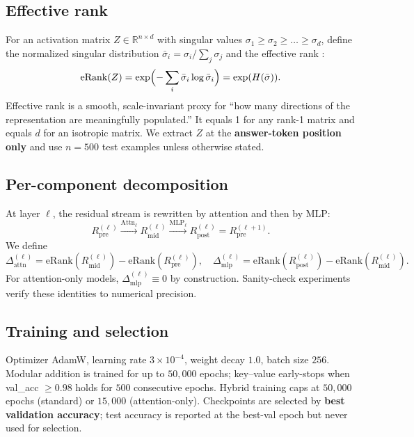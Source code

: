 \documentclass{article}
\begin{document}
\subsection{Effective rank}

For an activation matrix $Z\in\mathbb{R}^{n\times d}$ with singular values $\sigma_1\ge\sigma_2\ge\dots\ge\sigma_d$, define the normalized singular distribution $\bar{\sigma}_i=\sigma_i/\sum_j\sigma_j$ and the effective rank \citep{roy2007effective}:
\begin{equation}
    \mathrm{eRank}(Z) = \exp\Bigl(-\sum_i \bar{\sigma}_i\log\bar{\sigma}_i\Bigr) = \exp(H(\bar{\sigma})).
    \label{eq:erank}
\end{equation}
Effective rank is a smooth, scale-invariant proxy for ``how many directions of the representation are meaningfully populated.'' It equals 1 for any rank-1 matrix and equals $d$ for an isotropic matrix. We extract $Z$ at the \textbf{answer-token position only} and use $n=500$ test examples unless otherwise stated.

\subsection{Per-component decomposition}

At layer $\ell$, the residual stream is rewritten by attention and then by MLP:
\[ R_{\text{pre}}^{(\ell)} \xrightarrow{\text{Attn}_\ell} R_{\text{mid}}^{(\ell)} \xrightarrow{\text{MLP}_\ell} R_{\text{post}}^{(\ell)} = R_{\text{pre}}^{(\ell+1)}. \]
We define
\begin{equation}
    \Delta_{\text{attn}}^{(\ell)} = \mathrm{eRank}(R_{\text{mid}}^{(\ell)}) - \mathrm{eRank}(R_{\text{pre}}^{(\ell)}), \quad
    \Delta_{\text{mlp}}^{(\ell)} = \mathrm{eRank}(R_{\text{post}}^{(\ell)}) - \mathrm{eRank}(R_{\text{mid}}^{(\ell)}).
    \label{eq:deltas}
\end{equation}
For attention-only models, $\Delta_{\text{mlp}}^{(\ell)}\equiv 0$ by construction. Sanity-check experiments verify these identities to numerical precision.

\subsection{Training and selection}

Optimizer AdamW, learning rate $3\times 10^{-4}$, weight decay $1.0$, batch size $256$. Modular addition is trained for up to $50{,}000$ epochs; key--value early-stops when val\_acc $\ge 0.98$ holds for $500$ consecutive epochs. Hybrid training caps at $50{,}000$ epochs (standard) or $15{,}000$ (attention-only). Checkpoints are selected by \textbf{best validation accuracy}; test accuracy is reported at the best-val epoch but never used for selection.
\end{document}
